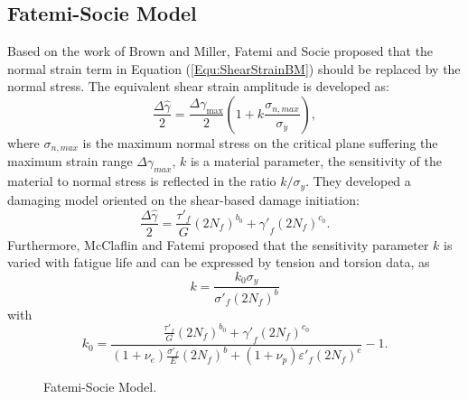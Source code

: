 \documentclass[preprint,5p,twocolumn,11pt,sort&compress]{elsarticle}
\begin{document}
\subsection{Fatemi-Socie Model}
Based on the work of Brown and Miller, Fatemi and Socie \cite{Fatemi1988} proposed that the normal strain term in Equation (\ref{Equ:ShearStrainBM}) should be replaced by the normal stress.
The equivalent shear strain amplitude is developed as:
\begin{equation}
\frac{{\Delta \hat \gamma }}{2} = \frac{{\Delta {\gamma _{\max }}}}{2}\left( {1 + k\frac{{{\sigma _{n,max}}}}{{{\sigma _y}}}} \right),
\end{equation}
where
$\sigma _{n,max}$ is the maximum normal stress on the critical plane suffering the maximum strain range $\Delta {\gamma _{max}}$, $k$ is a material parameter, the sensitivity of the material to normal stress is reflected in the ratio $k/\sigma_y$.
They developed a damaging model oriented on the shear-based damage initiation:
\begin{equation}
\frac{{\Delta \hat \gamma }}{2} = \frac{{{{\tau '}_f}}}{G}{\left( {2{N_f}} \right)^{{b_0}}} + {{\gamma '}_f}{\left( {2{N_f}} \right)^{{c_0}}}.
\end{equation}
Furthermore, McClaflin and Fatemi \cite{McClaflin2004} proposed that the sensitivity parameter $k$ is varied with fatigue life and can be expressed by tension and torsion data, as
\begin{equation}
k =  \frac{{k_0 {\sigma _y}}}{{{{\sigma '}_f}{{\left( {2{N_f}} \right)}^b}}}
\end{equation}
with
\[
k_0 =  {\frac{{\frac{{{{\tau '}_f}}}{G}{{\left( {2{N_f}} \right)}^{{b_0}}} + {{\gamma '}_f}{{\left( {2{N_f}} \right)}^{{c_0}}}}}{{\left( {1 + {\nu _e}} \right)\frac{{{{\sigma '}_f}}}{E}{{\left( {2{N_f}} \right)}^b} + \left( {1 + {\nu _p}} \right){{\varepsilon '}_f}{{\left( {2{N_f}} \right)}^c}}} - 1} .
\]

\begin{figure}[!htp]
\caption{Fatemi-Socie Model.}
\label{Fig:NF-NP-FS}
\end{figure}
\end{document}
